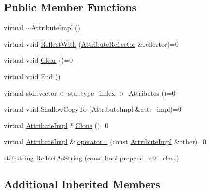 \subsection*{Public Member Functions}
\begin{DoxyCompactItemize}
\item 
virtual \mbox{\hyperlink{classlucene_1_1core_1_1util_1_1AttributeImpl_aeaca9fe2fd952878945f12a519311ec4}{$\sim$\+Attribute\+Impl}} ()
\item 
virtual void \mbox{\hyperlink{classlucene_1_1core_1_1util_1_1AttributeImpl_a84d34275fb1ed67ac36fad7ff6388096}{Reflect\+With}} (\mbox{\hyperlink{namespacelucene_1_1core_1_1util_a7dbb701adaed055f73fb95eec83da10a}{Attribute\+Reflector}} \&reflector)=0
\item 
virtual void \mbox{\hyperlink{classlucene_1_1core_1_1util_1_1AttributeImpl_a04897a00a902f7a345dd44bbc4b482a8}{Clear}} ()=0
\item 
virtual void \mbox{\hyperlink{classlucene_1_1core_1_1util_1_1AttributeImpl_a9a662ddc9b72bc9711883a25b8379ea9}{End}} ()
\item 
virtual std\+::vector$<$ std\+::type\+\_\+index $>$ \mbox{\hyperlink{classlucene_1_1core_1_1util_1_1AttributeImpl_ac0631e6a7a11044883bc97447716d7cc}{Attributes}} ()=0
\item 
virtual void \mbox{\hyperlink{classlucene_1_1core_1_1util_1_1AttributeImpl_a010e8937832f53139c8fe42757476895}{Shallow\+Copy\+To}} (\mbox{\hyperlink{classlucene_1_1core_1_1util_1_1AttributeImpl}{Attribute\+Impl}} \&attr\+\_\+impl)=0
\item 
virtual \mbox{\hyperlink{classlucene_1_1core_1_1util_1_1AttributeImpl}{Attribute\+Impl}} $\ast$ \mbox{\hyperlink{classlucene_1_1core_1_1util_1_1AttributeImpl_a135318ad4c7c17b3d85e625e32fb42cd}{Clone}} ()=0
\item 
virtual \mbox{\hyperlink{classlucene_1_1core_1_1util_1_1AttributeImpl}{Attribute\+Impl}} \& \mbox{\hyperlink{classlucene_1_1core_1_1util_1_1AttributeImpl_ab032e399d03ce2f58c76881cf2b92325}{operator=}} (const \mbox{\hyperlink{classlucene_1_1core_1_1util_1_1AttributeImpl}{Attribute\+Impl}} \&other)=0
\item 
std\+::string \mbox{\hyperlink{classlucene_1_1core_1_1util_1_1AttributeImpl_af3ad346d3dc7bbafa7957bcb48a9453e}{Reflect\+As\+String}} (const bool prepend\+\_\+att\+\_\+class)
\end{DoxyCompactItemize}
\subsection*{Additional Inherited Members}


